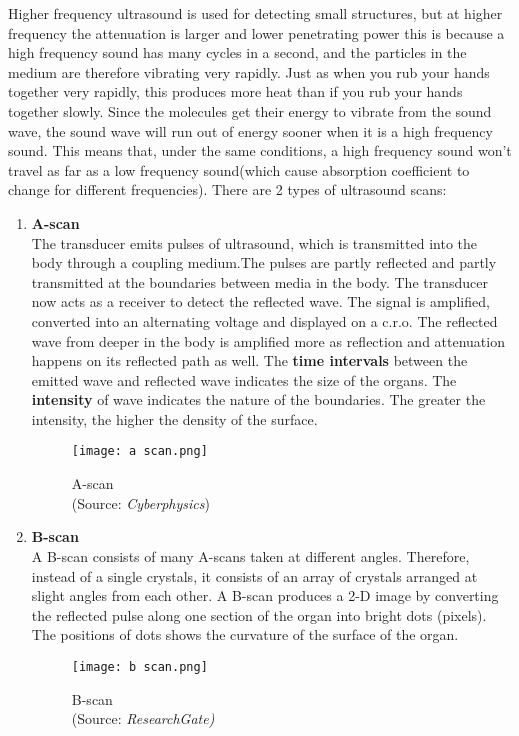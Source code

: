\documentclass{article}
\begin{document}
Higher frequency ultrasound is used for detecting small structures, but at higher frequency the attenuation is larger and lower penetrating power this is because a high frequency sound has many cycles in a second, and the particles in the medium are therefore vibrating very rapidly. Just as when you rub your hands together very rapidly, this produces more heat than if you rub your hands together slowly. Since the molecules get their energy to vibrate from the sound wave, the sound wave will run out of energy sooner when it is a high frequency sound. This means that, under the same conditions, a high frequency sound won’t travel as far as a low frequency sound(which cause absorption coefficient to change for different frequencies). There are 2 types of ultrasound scans:
\begin{enumerate}
    \item \textbf{A-scan}\\
    The transducer emits pulses of ultrasound, which is transmitted into the body through a coupling medium.The pulses are partly reflected and partly transmitted at the boundaries between media in the body. The transducer now acts as a receiver to detect the reflected wave. The signal is amplified, converted into an alternating voltage and displayed on a c.r.o. The reflected wave from deeper in the body is amplified more as reflection and attenuation happens on its reflected path as well. The \textbf{time intervals} between the emitted wave and reflected wave indicates the size of the organs. The \textbf{intensity} of wave indicates the nature of the boundaries. The greater the intensity, the higher the density of the surface.
    \begin{figure}[H]
        \centering
        \captionsetup{justification=centering,margin=2cm}
        \texttt{[image: a scan.png]}
        \caption*{A-scan \\ (Source: \textit{Cyberphysics})}
        \label{fig:my_label}
    \end{figure}
    \newpage
    \item \textbf{B-scan}\\
    A B-scan consists of many A-scans taken at different angles. Therefore, instead of a single crystals, it consists of an array of crystals arranged at slight angles from each other. A B-scan produces a 2-D image by converting the reflected pulse along one section of the organ into bright dots (pixels). The positions of dots shows the curvature of the surface of the organ.
    \begin{figure}[H]
        \centering
        \captionsetup{justification=centering,margin=2cm}
        \texttt{[image: b scan.png]}
        \caption*{B-scan \\ (Source: \textit{ResearchGate)}}
        \label{fig:my_label}
    \end{figure}
\end{enumerate}
\end{document}
